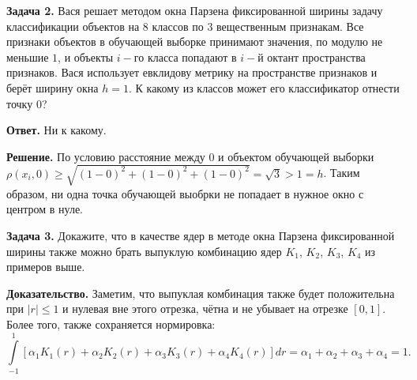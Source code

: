 \textbf{Задача 2.} Вася решает методом окна Парзена фиксированной ширины задачу классификации объектов на $8$ классов по $3$ вещественным признакам. Все признаки объектов в обучающей выборке принимают значения, по модулю не меньшие $1$, и объекты $i-$го класса попадают в $i-$й октант пространства признаков. Вася использует евклидову метрику на пространстве признаков и берёт ширину окна $h = 1$. К какому из классов может его классификатор отнести точку $0$?

\textbf{Ответ.} Ни к какому.

\textbf{Решение.} По условию расстояние между $0$ и объектом обучающей выборки $\rho(x_i,0)\ge\sqrt{(1-0)^2+(1-0)^2+(1-0)^2} = \sqrt{3} > 1 = h$. Таким образом, ни одна точка обучающей выобрки не попадает в нужное окно с центром в нуле.

\textbf{Задача 3.} Докажите, что в качестве ядер в методе окна Парзена фиксированной ширины также можно брать выпуклую комбинацию ядер $K_1$, $K_2$, $K_3$, $K_4$ из примеров выше.

\textbf{Доказательство.} Заметим, что выпуклая комбинация также будет положительна при $|r|\le 1$ и нулевая вне этого отрезка, чётна и не убывает на отрезке $[0,1]$. Более того, также сохраняется нормировка: 
\begin{equation*}
    \displaystyle\int\limits_{-1}^{1}\left[\alpha_1K_1(r)+\alpha_2K_2(r) +\alpha_3K_3(r)+\alpha_4K_4(r)\right]dr = \alpha_1 + \alpha_2 +\alpha_3 +\alpha_4 =1.
\end{equation*}
